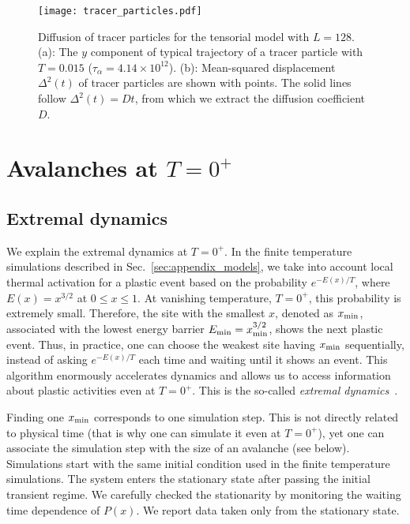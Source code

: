 \documentclass[pre,twocolumn,superscriptaddress,tightenlines,showpacs,longbibliography,floatfix,footinbib]{revtex4-1}
\begin{document}
\begin{figure}
\centering
\texttt{[image: tracer\_particles.pdf]}
\caption{Diffusion of tracer particles for the tensorial model with $L=128$. (a): The $y$ component of typical trajectory of a tracer particle with $T=0.015$ ($\tau_\alpha = 4.14 \times 10^{12}$).
(b): Mean-squared displacement $\Delta^2(t)$ of tracer particles are shown with points. The solid lines follow $\Delta^2(t) = D t$, from which we extract the diffusion coefficient $D$. 
}
\label{fig:tracer_particles}
\end{figure}


\section{Avalanches at $T=0^+$}
\label{sec:Appendix_extremal}

\subsection{Extremal dynamics}

We explain the extremal dynamics at $T=0^+$.
In the finite temperature simulations described in Sec.~\ref{sec:appendix_models}, we take into account local thermal activation for a plastic event based on the probability $e^{-E(x)/T}$, where $E(x)=x^{3/2}$ at $0 \leq x \leq1$.
At vanishing temperature, $T=0^+$, this probability is extremely small. Therefore, the site with the smallest $x$, denoted as $x_{\rm min}$, associated with the lowest energy barrier $E_{\rm min}=x_{\rm min}^{3/2}$, shows the next plastic event. 
Thus, in practice, one can choose the weakest site having $x_{\rm min}$ sequentially, instead of asking $e^{- E(x)/T}$ each time and waiting until it shows an event. 
This algorithm enormously accelerates dynamics and allows us to access information about plastic activities even at $T=0^+$. 
This is the so-called {\it extremal dynamics}~\cite{paczuski1996avalanche,Baret2002,purrello2017creep}.

Finding one $x_{\rm min}$ corresponds to one simulation step. This is not directly related to physical time (that is why one can simulate it even at $T=0^+$), yet one can associate the simulation step with the size of an avalanche (see below).  
Simulations start with the same initial condition used in the finite temperature simulations. 
The system enters the stationary state after passing the initial transient regime. We carefully checked the stationarity by monitoring the waiting time dependence of $P(x)$. We report data taken only from the stationary state. 
\end{document}

